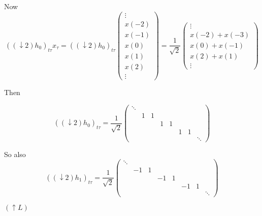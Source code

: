 \documentclass[twoside]{amsart}
\theoremstyle{plain}
\theoremstyle{definition}
\theoremstyle{remark}
\numberwithin{equation}{section}
\begin{document}
Now
\[
((\downarrow 2)h_0)_{t\tau} x_{\tau} = ((\downarrow 2)h_0)_{t\tau}\left( \begin{matrix} \vdots \\ x(-2) \\ x(-1) \\ x(0) \\ x(1) \\ x(2) \\ \vdots \end{matrix} \right) = \frac{1}{\sqrt{2}} \left( \begin{matrix} \vdots \\ x(-2) + x(-3) \\ x(0) + x(-1) \\ x(2) + x(1) \\ \vdots \end{matrix} \right) 
\]

Then 

\[
((\downarrow 2)h_0)_{t\tau} = \frac{1}{\sqrt{2}} \left( \begin{matrix} \ddots & & & & & & & \\ 
  & 1 & 1 &    &   &    &   & \\
  &    &   & 1 & 1 &    &   & \\
  &    &   &    &   & 1 & 1 & \\
  &    &   &    &   &    &   & \ddots \end{matrix} \right)
\]


So also
\[
((\downarrow 2)h_1)_{t\tau} = \frac{1}{\sqrt{2}} \left( \begin{matrix} \ddots & & & & & & & \\ 
  & -1 & 1 &    &   &    &   & \\
  &    &   & -1 & 1 &    &   & \\
  &    &   &    &   & -1 & 1 & \\
  &    &   &    &   &    &   & \ddots \end{matrix} \right)
\]

$(\uparrow L)$ \\
\end{document}

